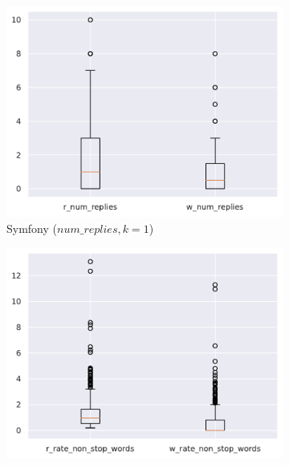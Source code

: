 \documentclass[12pt,openany,oneside,a4paper,english,brazil]{abntbibufjf}
\begin{document}
  \begin{figure}[htbp]
     \centering
     \begin{subfigure}[b]{0.475\textwidth}
         \centering
         \includegraphics[width=\textwidth]{resultados/boxplot/coresamecluster_highlight_symfony_replies_1}
         \caption[Symfony ($num\_replies, k = 1$)]%
         {{\small Symfony ($num\_replies, k = 1$)}}
         \label{fig:coresamecluster_highlight_symfony_replies_1}
     \end{subfigure}
     \hfill
     \begin{subfigure}[b]{0.475\textwidth}
         \centering
         \includegraphics[width=\textwidth]{resultados/boxplot/coresamecluster_highlight_symfony_non_stop_words_10}

\end{subfigure}
\end{figure}
\end{document}
